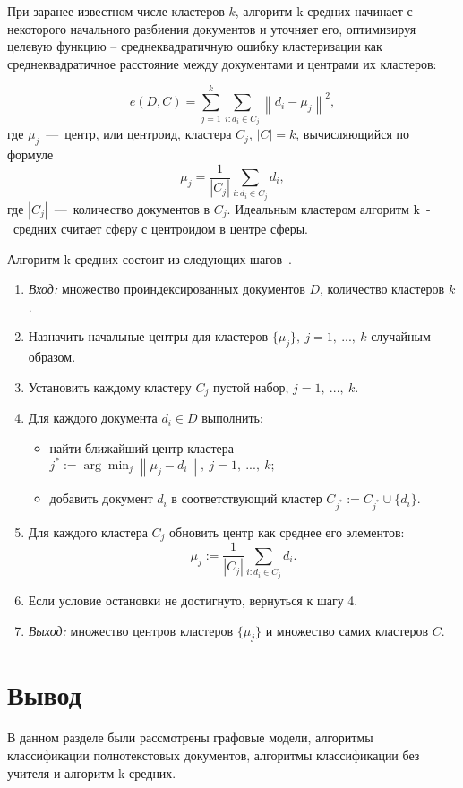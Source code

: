 При заранее известном числе кластеров \( k \), алгоритм k-средних начинает с некоторого начального разбиения документов и уточняет его, оптимизируя целевую функцию – среднеквадратичную ошибку кластеризации как среднеквадратичное расстояние между документами и центрами их кластеров:

\begin{equation}
	e(D, C) = \sum_{j=1}^{k} \sum_{i:d_i \in C_j} \left\| d_i - \mu_j \right\|^2,
\end{equation}
где \( \mu_j \)~---~центр, или центроид, кластера \( C_j \), \( |C| = k \), вычисляющийся по формуле
\begin{equation}
	\mu_j = \frac{1}{|C_j|} \sum_{i:d_i \in C_j} d_i,
\end{equation}
где \( |C_j| \)~---~количество документов в \( C_j \). Идеальным кластером алгоритм k~-~средних считает сферу с центроидом в центре сферы.

Алгоритм k-средних состоит из следующих шагов~\cite{main-book}.
\begin{enumerate}
	\item \textit{Вход:} множество проиндексированных документов \( D \), количество кластеров \( k \). %
	\item Назначить начальные центры для кластеров \( \{ \mu_j \},\ j = 1,\ ...,\ k \) случайным образом. %
	\item Установить каждому кластеру \( C_j \) пустой набор, \( j = 1,\ ...,\ k \). %
	\item Для каждого документа \( d_i \in D \) выполнить: %
	\begin{itemize}
		\item найти ближайший центр кластера \( j^* := \arg \min_j \left\| \mu_j - d_i \right\|,\ j = 1,\ ...,\ k; \) %
		\item добавить документ \( d_i \) в соответствующий кластер \( C_{j^*} := C_{j^*} \cup \{d_i\}. \) %
	\end{itemize}
	\item Для каждого кластера \( C_j \) обновить центр как среднее его элементов: %
	\[ \mu_j := \frac{1}{|C_j|} \sum_{i:d_i \in C_j} d_i. \]
	\item Если условие остановки не достигнуто, вернуться к шагу 4. %
	\item \textit{Выход:} множество центров кластеров \( \{ \mu_j \} \) и множество самих кластеров \( C \). %
\end{enumerate}


\section *{Вывод}
В данном разделе были рассмотрены графовые модели, алгоритмы классификации полнотекстовых документов, алгоритмы классификации без учителя и алгоритм k-средних.

